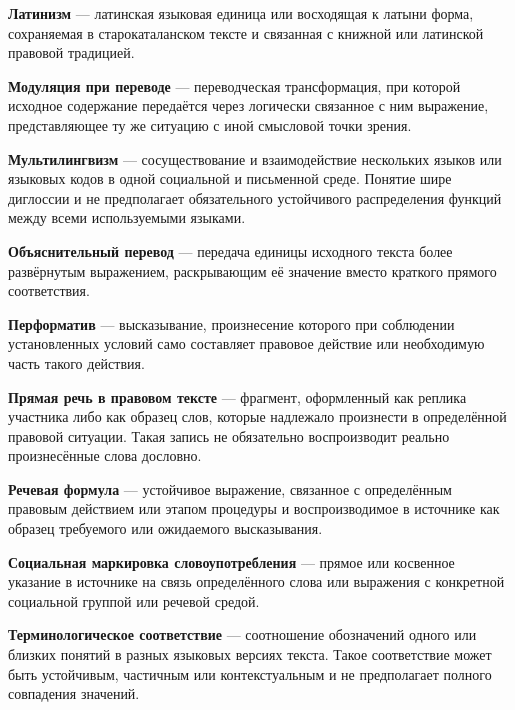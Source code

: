 \noindent\textbf{Латинизм} --- латинская языковая единица или восходящая к латыни форма, сохраняемая в старокаталанском тексте и связанная с книжной или латинской правовой традицией.
\par\medskip

\noindent\textbf{Модуляция при переводе} --- переводческая трансформация, при которой исходное содержание передаётся через логически связанное с ним выражение, представляющее ту же ситуацию с иной смысловой точки зрения.
\par\medskip

\noindent\textbf{Мультилингвизм} --- сосуществование и взаимодействие нескольких языков или языковых кодов в одной социальной и письменной среде. Понятие шире диглоссии и не предполагает обязательного устойчивого распределения функций между всеми используемыми языками.
\par\medskip

\noindent\textbf{Объяснительный перевод} --- передача единицы исходного текста более развёрнутым выражением, раскрывающим её значение вместо краткого прямого соответствия.
\par\medskip

\noindent\textbf{Перформатив} --- высказывание, произнесение которого при соблюдении установленных условий само составляет правовое действие или необходимую часть такого действия.
\par\medskip

\noindent\textbf{Прямая речь в правовом тексте} --- фрагмент, оформленный как реплика участника либо как образец слов, которые надлежало произнести в определённой правовой ситуации. Такая запись не обязательно воспроизводит реально произнесённые слова дословно.
\par\medskip

\noindent\textbf{Речевая формула} --- устойчивое выражение, связанное с определённым правовым действием или этапом процедуры и воспроизводимое в источнике как образец требуемого или ожидаемого высказывания.
\par\medskip

\noindent\textbf{Социальная маркировка словоупотребления} --- прямое или косвенное указание в источнике на связь определённого слова или выражения с конкретной социальной группой или речевой средой.
\par\medskip

\noindent\textbf{Терминологическое соответствие} --- соотношение обозначений одного или близких понятий в разных языковых версиях текста. Такое соответствие может быть устойчивым, частичным или контекстуальным и не предполагает полного совпадения значений.
\par\medskip

